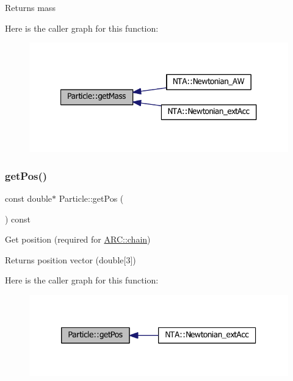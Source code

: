 \begin{DoxyReturn}{Returns}
mass 
\end{DoxyReturn}
Here is the caller graph for this function\+:
\nopagebreak
\begin{figure}[H]
\begin{center}
\leavevmode
\includegraphics[width=327pt]{classParticle_a2576aff503f68e78ced91406512b1255_icgraph}
\end{center}
\end{figure}
\hypertarget{classParticle_a4ec76421cddd91b1f27357fb182f6923}{}\label{classParticle_a4ec76421cddd91b1f27357fb182f6923} 
\subsubsection{\texorpdfstring{get\+Pos()}{getPos()}}
{\footnotesize\ttfamily const double$\ast$ Particle\+::get\+Pos (\begin{DoxyParamCaption}{ }\end{DoxyParamCaption}) const\hspace{0.3cm}{\ttfamily [inline]}}



Get position (required for \hyperlink{classARC_1_1chain}{A\+R\+C\+::chain}) 

\begin{DoxyReturn}{Returns}
position vector (double\mbox{[}3\mbox{]}) 
\end{DoxyReturn}
Here is the caller graph for this function\+:
\nopagebreak
\begin{figure}[H]
\begin{center}
\leavevmode
\includegraphics[width=320pt]{classParticle_a4ec76421cddd91b1f27357fb182f6923_icgraph}
\end{center}
\end{figure}
\hypertarget{classParticle_ab3d63df7f8c22f232b096ae33b6ea3ac}{}\label{classParticle_ab3d63df7f8c22f232b096ae33b6ea3ac} 

